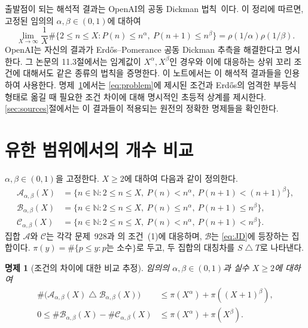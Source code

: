 \documentclass[11pt,a4paper]{amsart}
\theoremstyle{korplain}
\newtheorem{proposition}{명제}
\newcommand{\N}{\mathbb N}
\newcommand{\A}{\mathcal A}
\newcommand{\B}{\mathcal B}
\newcommand{\C}{\mathcal C}
\begin{document}
출발점이 되는 해석적 결과는 OpenAI의 공동 Dickman
법칙~\cite[정리~1.1, 2쪽]{OpenAI2026}이다.
이 정리에 따르면, 고정된 임의의 $\alpha,\beta\in(0,1)$에 대하여
\begin{equation}\label{eq:JD}
 \lim_{X\to\infty}\frac1X
 \#\{2\le n\le X:P(n)\le n^\alpha,\ P(n+1)\le n^\beta\}
 =\rho(1/\alpha)\rho(1/\beta).
\end{equation}
OpenAI는 자신의 결과가 Erd\H{o}s--Pomerance 공동 Dickman 추측을 해결한다고 명시한다.
그 논문의 11.3절에서는 임계값이 $X^\alpha,X^\beta$인 경우와
이에 대응하는 상위 꼬리 조건에 대해서도 같은 종류의 법칙을 증명한다.
이 노트에서는 이 해석적 결과들을 인용하여 사용한다.
명제~\ref{prop:comparison}에서는 \eqref{eq:problem}에 제시된 조건과 Erd\H{o}s의 엄격한
부등식 형태로 옮길 때 필요한 조건 차이에 대해 명시적인 초등적 상계를 제시한다.
\ref{sec:sources}절에서는 이 결과들이 적용되는 원전의 정확한 명제들을 확인한다.

\section{유한 범위에서의 개수 비교}\label{sec:comparison}

$\alpha,\beta\in(0,1)$을 고정한다. $X\ge2$에 대하여 다음과 같이 정의한다.
\begin{align*}
 \A_{\alpha,\beta}(X)
   &=\{n\in\N:2\le n\le X,\ P(n)<n^\alpha,
                                \ P(n+1)<(n+1)^\beta\},\\
 \B_{\alpha,\beta}(X)
   &=\{n\in\N:2\le n\le X,\ P(n)\le n^\alpha,
                                \ P(n+1)\le n^\beta\},\\
 \C_{\alpha,\beta}(X)
   &=\{n\in\N:2\le n\le X,\ P(n)<n^\alpha,
                                \ P(n+1)<n^\beta\}.
\end{align*}
집합 $\A$와 $\C$는 각각 문제~928과
\cite[25쪽]{Erdos1976Manitoba}의 조건~(1)에 대응하며,
$\B$는 \eqref{eq:JD}에 등장하는 집합이다.
$\pi(y)=\#\{p\le y:p\text{는 소수}\}$로 두고,
두 집합의 대칭차를 $S\mathbin\triangle T$로 나타낸다.

\begin{proposition}[조건의 차이에 대한 비교 추정]\label{prop:comparison}
임의의 $\alpha,\beta\in(0,1)$과 실수 $X\ge2$에 대하여
\begin{align}
 \#\bigl(\A_{\alpha,\beta}(X)\mathbin\triangle
          \B_{\alpha,\beta}(X)\bigr)
 &\le \pi(X^\alpha)+\pi((X+1)^\beta),\label{eq:AB}\\
 0\le\#\B_{\alpha,\beta}(X)-\#\C_{\alpha,\beta}(X)
 &\le \pi(X^\alpha)+\pi(X^\beta).\label{eq:BC}
\end{align}
\end{proposition}
\end{document}
